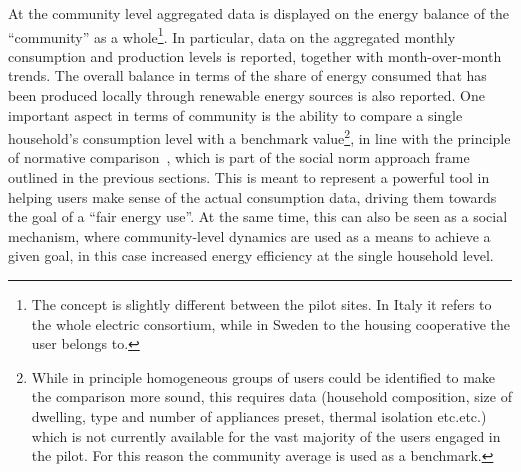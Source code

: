 At the community level aggregated data is displayed on the energy balance of the ``community'' as a whole\footnote{The concept is slightly different between the pilot sites. In Italy it refers to the whole electric consortium, while in Sweden to the housing cooperative the user belongs to.}. 
In particular, data on the aggregated monthly consumption and production levels is reported, together with month-over-month trends. The overall balance in terms of the share of energy consumed that has been produced locally through renewable energy sources is also reported. One important aspect in terms of community is the ability to compare a single household's consumption level with a benchmark value\footnote{While in principle homogeneous groups of users could be identified to make the comparison more sound, this requires data (household composition, size of dwelling, type and number of appliances preset, thermal isolation etc.etc.) which is not currently available for the vast majority of the users engaged in the pilot. For this reason the community average is used as a benchmark.}, in line with the principle of normative comparison~\citep{d3.1,cialdini2004}, which is part of the social norm approach frame outlined in the previous sections. This is meant to represent a powerful tool in helping users make sense of the actual consumption data, driving them towards the goal of a ``fair energy use''. At the same time, this can also be seen as a social mechanism, where community-level dynamics are used as a means to achieve a given goal, in this case increased energy efficiency at the single household level.

